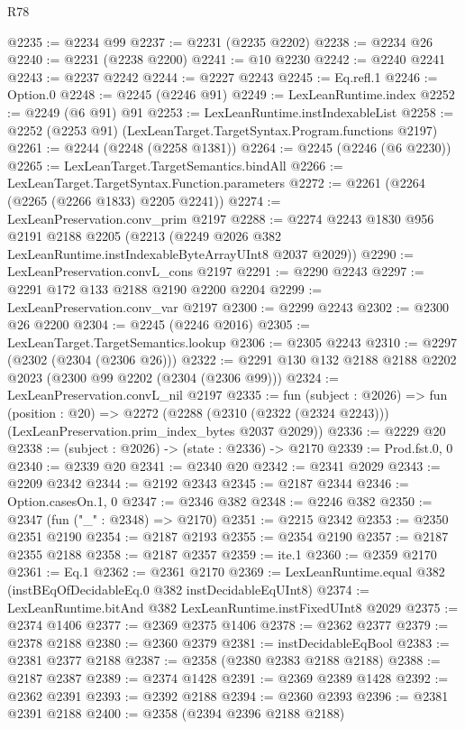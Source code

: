 \begin{lexlean}{R78}
\begin{coremodule}
@2235 := @2234 @99
@2237 := @2231 (@2235 @2202)
@2238 := @2234 @26
@2240 := @2231 (@2238 @2200)
@2241 := @10 @2230
@2242 := @2240 @2241
@2243 := @2237 @2242
@2244 := @2227 @2243
@2245 := Eq.refl.{1}
@2246 := Option.{0}
@2248 := @2245 (@2246 @91)
@2249 := LexLeanRuntime.index
@2252 := @2249 (@6 @91) @91
@2253 := LexLeanRuntime.instIndexableList
@2258 := @2252 (@2253 @91) (LexLeanTarget.TargetSyntax.Program.functions @2197)
@2261 := @2244 (@2248 (@2258 @1381))
@2264 := @2245 (@2246 (@6 @2230))
@2265 := LexLeanTarget.TargetSemantics.bindAll
@2266 := LexLeanTarget.TargetSyntax.Function.parameters
@2272 := @2261 (@2264 (@2265 (@2266 @1833) @2205 @2241))
@2274 := LexLeanPreservation.conv_prim @2197
@2288 := @2274
    @2243
    @1830
    @956
    @2191
    @2188
    @2205
    (@2213 (@2249 @2026 @382 LexLeanRuntime.instIndexableByteArrayUInt8 @2037 @2029))
@2290 := LexLeanPreservation.convL_cons @2197
@2291 := @2290 @2243
@2297 := @2291 @172 @133 @2188 @2190 @2200 @2204
@2299 := LexLeanPreservation.conv_var @2197
@2300 := @2299 @2243
@2302 := @2300 @26 @2200
@2304 := @2245 (@2246 @2016)
@2305 := LexLeanTarget.TargetSemantics.lookup
@2306 := @2305 @2243
@2310 := @2297 (@2302 (@2304 (@2306 @26)))
@2322 := @2291 @130 @132 @2188 @2188 @2202 @2023 (@2300 @99 @2202 (@2304 (@2306 @99)))
@2324 := LexLeanPreservation.convL_nil @2197
@2335 := fun (subject : @2026) =>
  fun (position : @20) =>
  @2272 (@2288 (@2310 (@2322 (@2324 @2243))) (LexLeanPreservation.prim_index_bytes @2037 @2029))
@2336 := @2229 @20
@2338 := (subject : @2026) -> (state : @2336) -> @2170
@2339 := Prod.fst.{0, 0}
@2340 := @2339 @20
@2341 := @2340 @20
@2342 := @2341 @2029
@2343 := @2209 @2342
@2344 := @2192 @2343
@2345 := @2187 @2344
@2346 := Option.casesOn.{1, 0}
@2347 := @2346 @382
@2348 := @2246 @382
@2350 := @2347 (fun ("_" : @2348) => @2170)
@2351 := @2215 @2342
@2353 := @2350 @2351 @2190
@2354 := @2187 @2193
@2355 := @2354 @2190
@2357 := @2187 @2355 @2188
@2358 := @2187 @2357
@2359 := ite.{1}
@2360 := @2359 @2170
@2361 := Eq.{1}
@2362 := @2361 @2170
@2369 := LexLeanRuntime.equal @382 (instBEqOfDecidableEq.{0} @382 instDecidableEqUInt8)
@2374 := LexLeanRuntime.bitAnd @382 LexLeanRuntime.instFixedUInt8 @2029
@2375 := @2374 @1406
@2377 := @2369 @2375 @1406
@2378 := @2362 @2377
@2379 := @2378 @2188
@2380 := @2360 @2379
@2381 := instDecidableEqBool
@2383 := @2381 @2377 @2188
@2387 := @2358 (@2380 @2383 @2188 @2188)
@2388 := @2187 @2387
@2389 := @2374 @1428
@2391 := @2369 @2389 @1428
@2392 := @2362 @2391
@2393 := @2392 @2188
@2394 := @2360 @2393
@2396 := @2381 @2391 @2188
@2400 := @2358 (@2394 @2396 @2188 @2188)

\end{coremodule}
\end{lexlean}
